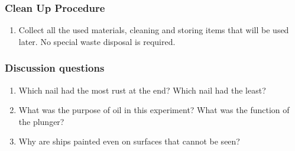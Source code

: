 \subsubsection*{Clean Up Procedure}
\begin{enumerate}
\item{Collect all the used materials, cleaning and storing items that will be used later. No special waste disposal is required.}
\end{enumerate}
\subsubsection*{Discussion questions}
\begin{enumerate}
\item{Which nail had the most rust at the end? Which nail had the least?}
\item{What was the purpose of oil in this experiment? What was the function of the plunger?}
\item{Why are ships painted even on surfaces that cannot be seen?}
\end{enumerate}